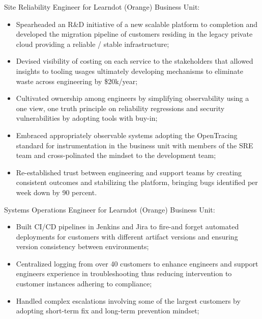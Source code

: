 \documentclass[11pt,a4paper,nolmodern,colorlinks=true,linkcolor=true]{moderncv}
\begin{document}
%
  {Site Reliability Engineer for Learndot (Orange) Business Unit:
    \begin{itemize}
      \item Spearheaded an R\&D initiative of a new scalable platform to completion and developed the migration pipeline of customers residing in the legacy private cloud providing a reliable / stable infrastructure;
      \item Devised visibility of costing on each service to the stakeholders that allowed insights to tooling usages ultimately developing mechanisms to eliminate waste across engineering by \$20k/year;
      \item Cultivated ownership among engineers by simplifying observability using a one view, one truth principle on reliability regressions and security vulnerabilities by adopting tools with buy-in;
      \item Embraced appropriately observable systems adopting the OpenTracing standard for instrumentation in the business unit with members of the SRE team and cross-polinated the mindset to the development team;
      \item Re-established trust between engineering and support teams by creating consistent outcomes and stabilizing the platform, bringing bugs identified per week down by 90 percent.
    \end{itemize}
}

%
  {Systems Operations Engineer for Learndot (Orange) Business Unit:
    \begin{itemize}
      \item Built CI/CD pipelines in Jenkins and Jira to fire-and forget automated deployments for customers with different artifact versions and ensuring version consistency between environments;
      \item Centralized logging from over 40 customers to enhance engineers and support engineers experience in troubleshooting thus reducing intervention to customer instances adhering to compliance;
      \item Handled complex escalations involving some of the largest customers by adopting short-term fix and long-term prevention mindset;
    \end{itemize}
}
\end{document}
